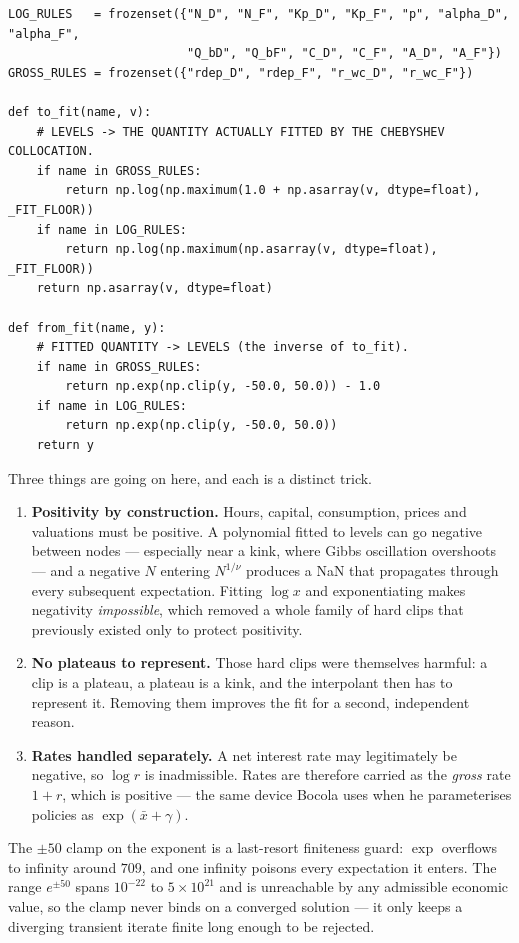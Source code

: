 \documentclass[11pt]{article}
\numberwithin{equation}{section}
\newcommand{\code}[1]{\texttt{\small #1}}
\theoremstyle{definition}
\theoremstyle{plain}
\theoremstyle{remark}
\begin{document}
\begin{lstlisting}[caption={The fit transform. \code{decision\_rules.py}.}]
LOG_RULES   = frozenset({"N_D", "N_F", "Kp_D", "Kp_F", "p", "alpha_D", "alpha_F",
                         "Q_bD", "Q_bF", "C_D", "C_F", "A_D", "A_F"})
GROSS_RULES = frozenset({"rdep_D", "rdep_F", "r_wc_D", "r_wc_F"})

def to_fit(name, v):
    # LEVELS -> THE QUANTITY ACTUALLY FITTED BY THE CHEBYSHEV COLLOCATION.
    if name in GROSS_RULES:
        return np.log(np.maximum(1.0 + np.asarray(v, dtype=float), _FIT_FLOOR))
    if name in LOG_RULES:
        return np.log(np.maximum(np.asarray(v, dtype=float), _FIT_FLOOR))
    return np.asarray(v, dtype=float)

def from_fit(name, y):
    # FITTED QUANTITY -> LEVELS (the inverse of to_fit).
    if name in GROSS_RULES:
        return np.exp(np.clip(y, -50.0, 50.0)) - 1.0
    if name in LOG_RULES:
        return np.exp(np.clip(y, -50.0, 50.0))
    return y
\end{lstlisting}

Three things are going on here, and each is a distinct trick.

\begin{enumerate}
\item \textbf{Positivity by construction.} Hours, capital, consumption, prices and
      valuations must be positive. A polynomial fitted to levels can go negative
      between nodes --- especially near a kink, where Gibbs oscillation overshoots ---
      and a negative $N$ entering $N^{1/\nu}$ produces a NaN that propagates through
      every subsequent expectation. Fitting $\log x$ and exponentiating makes
      negativity \emph{impossible}, which removed a whole family of hard clips that
      previously existed only to protect positivity.
\item \textbf{No plateaus to represent.} Those hard clips were themselves harmful:
      a clip is a plateau, a plateau is a kink, and the interpolant then has to
      represent it. Removing them improves the fit for a second, independent reason.
\item \textbf{Rates handled separately.} A net interest rate may legitimately be
      negative, so $\log r$ is inadmissible. Rates are therefore carried as the
      \emph{gross} rate $1+r$, which is positive --- the same device Bocola uses when
      he parameterises policies as $\exp(\bar x+\gamma)$.
\end{enumerate}

The $\pm50$ clamp on the exponent is a last-resort finiteness guard: $\exp$ overflows
to infinity around $709$, and one infinity poisons every expectation it enters. The
range $e^{\pm50}$ spans $10^{-22}$ to $5\times10^{21}$ and is unreachable by any
admissible economic value, so the clamp never binds on a converged solution --- it
only keeps a diverging transient iterate finite long enough to be rejected.
\end{document}
